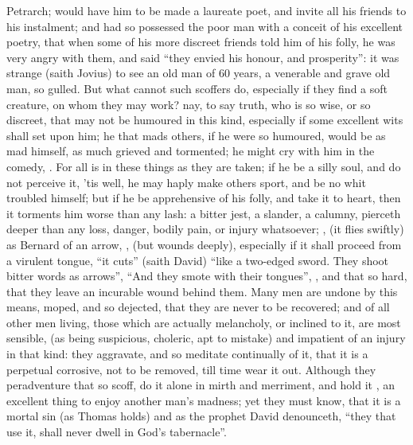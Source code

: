 Petrarch; would have him to be made a laureate poet, and invite all his friends
to his instalment; and had so possessed the poor man with a conceit of his
excellent poetry, that when some of his more discreet friends told him of his
folly, he was very angry with them, and said \enquote{they envied
his honour, and prosperity}: it was strange (saith Jovius) to see an old man of
60 years, a venerable and grave old man, so gulled. But what cannot such
scoffers do, especially if they find a soft creature, on whom they may work?
nay, to say truth, who is so wise, or so discreet, that may not be humoured in
this kind, especially if some excellent wits shall set upon him; he that mads
others, if he were so humoured, would be as mad himself, as much grieved and
tormented; he might cry with him in the comedy, . For all is in these things as they are taken; if he be a
silly soul, and do not perceive it, 'tis well, he may haply make others sport,
and be no whit troubled himself; but if he be apprehensive of his folly, and
take it to heart, then it torments him worse than any lash: a bitter jest, a
slander, a calumny, pierceth deeper than any loss, danger, bodily pain, or
injury whatsoever; , (it flies swiftly) as Bernard of an
arrow, , (but wounds deeply), especially if it shall
proceed from a virulent tongue, \enquote{it cuts} (saith David) \enquote{like a two-edged
sword. They shoot bitter words as arrows},  \enquote{And
they smote with their tongues}, , and that so
hard, that they leave an incurable wound behind them. Many men are undone by
this means, moped, and so dejected, that they are never to be recovered; and of
all other men living, those which are actually melancholy, or inclined to it,
are most sensible, (as being suspicious, choleric, apt to mistake) and
impatient of an injury in that kind: they aggravate, and so meditate
continually of it, that it is a perpetual corrosive, not to be removed, till
time wear it out. Although they peradventure that so scoff, do it alone in
mirth and merriment, and hold it , an excellent
thing to enjoy another man's madness; yet they must know, that it is a mortal
sin (as Thomas holds) and as the prophet
David denounceth, \enquote{they that use it, shall never dwell in
God's tabernacle}.

